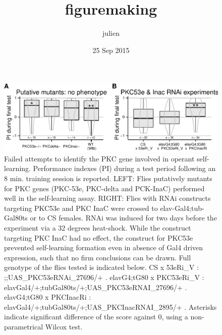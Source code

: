 \documentclass[]{article}
\title{figuremaking}
\author{julien}
\date{25 Sep 2015}
\begin{document}
\maketitle


\begin{figure}[htbp]
\centering
\includegraphics{firsttest_files/figure-latex/unnamed-chunk-2-1.pdf}
\caption{\label{fig:PKC} Failed attempts to identify the PKC gene
involved in operant self-learning. Performance indexes (PI) during a
test period following an 8 min. training session is reported. LEFT:
Flies putatively mutants for PKC genes (PKC-53e, PKC-delta and PCK-InaC)
performed well in the self-learning assay. RIGHT: Flies with RNAi
constructs targeting PKC53e and PKC InaC were crossed to
elav-Gal4;tub-Gal80ts or to CS females. RNAi was induced for two days
before the experiment via a 32 degrees heat-shock. While the construct
targeting PKC InaC had no effect, the construct for PKC53e prevented
self-learning formation even in absence of Gal4 driven expression, such
that no firm conclusions can be drawn. Full genotype of the flies tested
is indicated below. CS x 53eRi\_V : ;;UAS\_PKC53eRNAi\_27696/+ .
elavG4;tG80 x PKC53eRi\_V :
elavGal4/+;tubGal80ts/+;UAS\_PKC53eRNAI\_27696/+ . elavG4;tG80 x
PKCInacRi : elavGal4/+;tubGal80ts/+;UAS\_PKCInacRNAI\_2895/+ . Asterisks
indicate significant difference of the score against 0, using a
non-parametrical Wilcox test.}
\end{figure}
\end{document}

